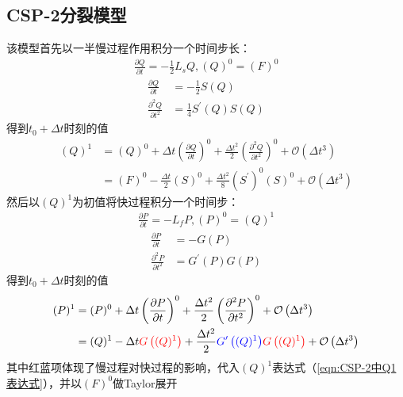 \documentclass{ctexart}
\begin{document}
\subsection{CSP-2分裂模型}
该模型首先以一半慢过程作用积分一个时间步长：
\begin{align}
  \frac{\partial Q}{\partial t} = - \frac{1}{2} L_s Q, (Q)^0 = (F)^0
\end{align}
\begin{align*}
  \frac{\partial Q}{\partial t} & = - \frac{1}{2} S(Q) \\
  \frac{\partial^2 Q}{\partial t^2} & = \frac{1}{4} S^\prime(Q) S(Q)
\end{align*}
得到$t_0 + \Delta{t}$时刻的值
\begin{align}
  (Q)^1 & = (Q)^0 + \Delta{t} \left( \frac{\partial Q}{\partial t} \right)^0 + \frac{\Delta{t}^2}{2} \left( \frac{\partial^2 Q}{\partial t^2} \right)^0 + \mathcal{O} \left( \Delta{t}^3 \right) \nonumber \\
  & = (F)^0 - \frac{\Delta{t}}{2} (S)^0 + \frac{\Delta{t}^2}{8} (S^\prime)^0 (S)^0 + \mathcal{O} \left( \Delta{t}^3 \right) \label{eqn:CSP-2中Q1表达式}
\end{align}
然后以$(Q)^1$为初值将快过程积分一个时间步：
\begin{align}
  \frac{\partial P}{\partial t} = - L_f P, (P)^0 = (Q)^1
\end{align}
\begin{align*}
  \frac{\partial P}{\partial t} & = - G(P) \\
  \frac{\partial^2 P}{\partial t^2} & = G^\prime(P) G(P)
\end{align*}
得到$t_0 + \Delta{t}$时刻的值
\begin{align}
  (P)^1 & = (P)^0 + \Delta{t} \left( \frac{\partial P}{\partial t} \right)^0 + \frac{\Delta{t}^2}{2} \left( \frac{\partial^2 P}{\partial t^2} \right)^0 + \mathcal{O} \left( \Delta{t}^3 \right) \nonumber \\
  & = (Q)^1 - \Delta{t} {\color{red}G\left((Q)^1\right)} + \frac{\Delta{t}^2}{2} {\color{blue}G^\prime\left((Q)^1\right)} {\color{red}G\left((Q)^1\right)} + \mathcal{O} \left( \Delta{t}^3 \right) \nonumber
\end{align}
其中红蓝项体现了慢过程对快过程的影响，代入$(Q)^1$表达式（\ref{eqn:CSP-2中Q1表达式}），并以$(F)^0$做Taylor展开
\end{document}
